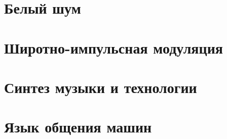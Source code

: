 \documentclass[a4paper,twoside]{book}
\begin{document}
\chapter{Белый шум}







\chapter{Широтно-импульсная модуляция}
\label{chapter:pwm}






\chapter{Синтез музыки и технологии}


















\chapter{Язык общения машин}



\end{document}
